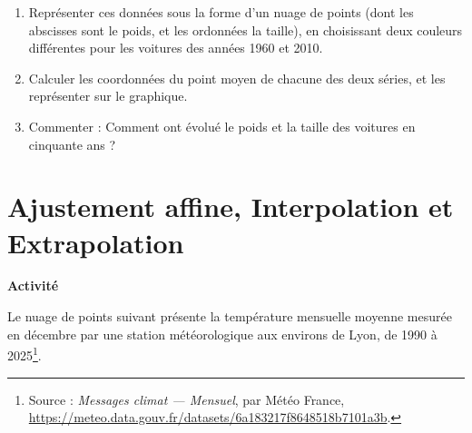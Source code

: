 \begin{enumerate}
    \item Représenter ces données sous la forme d'un nuage de points (dont les abscisses sont le poids, et les ordonnées la taille), en choisissant deux couleurs différentes pour les voitures des années 1960 et 2010.

        \begin{center}
        \end{center}
    \item Calculer les coordonnées du point moyen de chacune des deux séries, et les représenter sur le graphique.
    \item Commenter : Comment ont évolué le poids et la taille des voitures en cinquante ans ?
\end{enumerate}

\pagebreak

\section{Ajustement affine, Interpolation et Extrapolation}

\noindent\textbf{Activité}

Le nuage de points suivant présente la température mensuelle moyenne mesurée en décembre par une station météorologique aux environs de Lyon, de 1990 à 2025\footnote{Source : \emph{Messages climat — Mensuel}, par Météo France, \url{https://meteo.data.gouv.fr/datasets/6a183217f8648518b7101a3b}.}.

